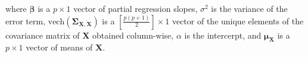 \noindent where
$\boldsymbol{\beta}$ is a $p \times 1$ vector of partial regression slopes,
$\sigma^2$ is the variance of the error term,
$\mathrm{vech} \left( \boldsymbol{\Sigma}_{\mathbf{X}, \mathbf{X}} \right)$
is a $\left[ \frac{p \left( p + 1 \right)}{2} \right] \times 1$ vector of the unique elements
of the covariance matrix of
$\mathbf{X}$
obtained column-wise,
$\alpha$ is the intercerpt,
and
$\boldsymbol{\mu}_{\mathbf{X}}$
is a $p \times 1$ vector of
means of $\mathbf{X}$.
